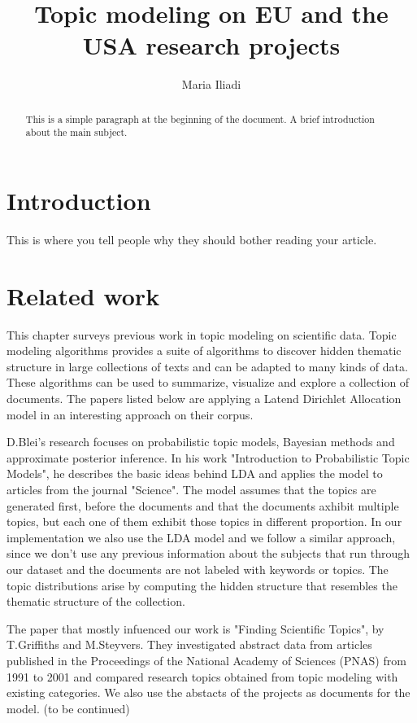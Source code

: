 \documentclass[12pt]{report}
\title{Topic modeling on EU and the USA research projects}
\author{Maria Iliadi}
\begin{document}
\maketitle
\tableofcontents


\begin{abstract}
This is a simple paragraph at the beginning of the document. 
A brief introduction about the main subject.
\end{abstract}


\section{Introduction}
This is where you tell people why they should bother reading your article.

\section{Related work}

This chapter surveys previous work in topic modeling on scientific data. Topic
modeling algorithms provides a suite of algorithms to discover hidden thematic
structure in large collections of texts and can be adapted to many kinds of
data. These algorithms can be used to summarize, visualize and explore a
collection of documents. The papers listed below are applying a Latend Dirichlet
Allocation model in an interesting approach on their corpus.

D.Blei's research focuses on probabilistic topic models, Bayesian methods and
approximate posterior inference. In his work "Introduction to Probabilistic
Topic Models",\cite{Blei11introductionto} he describes the basic ideas behind
LDA and applies the model to articles from the journal "Science". The model
assumes that the topics are generated first, before the documents and that the
documents axhibit multiple topics, but each one of them exhibit those topics in
different proportion. In our implementation we also use the LDA model and we
follow a similar approach, since we don't use any previous information about the
subjects that run through our dataset and the documents are not labeled with
keywords or topics. The topic distributions arise by computing the hidden
structure that resembles the thematic structure of the collection.

The paper that mostly infuenced our work is "Finding Scientific Topics", by
T.Griffiths and M.Steyvers.\cite{griffiths_steyvers04} They investigated
abstract data from articles published in the Proceedings of the National Academy
of Sciences (PNAS) from 1991 to 2001 and compared research topics obtained from
topic modeling with existing categories. We also use the abstacts of the
projects as documents for the model. (to be continued)
\end{document}
